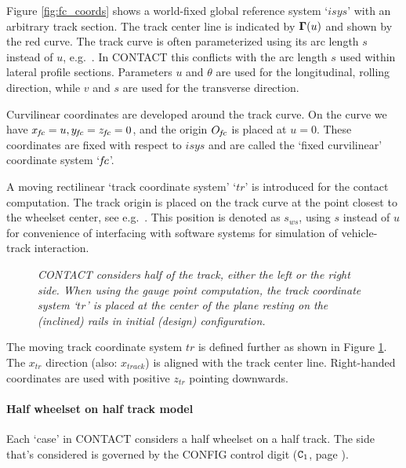 \documentclass[12pt]{report}
\begin{document}
Figure \ref{fig:fc_coords} shows a world-fixed global reference system
`$isys$' with an arbitrary track section. The track center line is indicated
by $\boldsymbol{\Gamma}(u)$ and shown by the red curve. The track curve is
often parameterized using its arc length $s$ instead of $u$, e.g.\
\cite{Shabana2008}. In CONTACT this conflicts with the arc length $s$ used
within lateral profile sections. Parameters $u$ and $\theta$ are used for
the longitudinal, rolling direction, while $v$ and $s$ are used for the
transverse direction.

Curvilinear coordinates are developed around the track curve. On the curve
we have $x_{\mkern-2muf\mkern-2muc}=u, y_{\mkern-2muf\mkern-2muc}=z_{\mkern-2muf\mkern-2muc}=0$, and the origin $O_{\mkern-2muf\mkern-2muc}$ is placed
at $u=0$. These coordinates are fixed with respect to $isys$ and are called
the `fixed curvilinear' coordinate system `$\mkern-2muf\mkern-2muc$'.

A moving rectilinear `track coordinate system' `$tr$' is introduced for the
contact computation. The track origin is placed on the track curve at the
point closest to the wheelset center, see e.g.\ \cite{Malvezzi2008}. This
position is denoted as $s_{ws}$, using $s$ instead of $u$ for
convenience of interfacing with software systems for simulation of
vehicle-track interaction.

\begin{figure}[bt]
\centering
{}
\caption{\em CONTACT considers half of the track, either the left or the
        right side. When using the gauge point computation, the track
        coordinate system `$tr$' is placed at the center of the plane resting
        on the (inclined) rails in initial (design) configuration.}
\label{fig:track_coords}
\end{figure}

The moving track coordinate system $tr$ is defined further as shown in
Figure \ref{fig:track_coords}. The $x_{tr}$ direction (also: $x_{track}$) is
aligned with the track center line. Right-handed coordinates are used with
positive $z_{tr}$ pointing downwards.

\paragraph{Half wheelset on half track model}

Each `case' in CONTACT considers a half wheelset on a half track. The side
that's considered is governed by the CONFIG control digit (${\tt C}_1$,
page \pageref{c1-digit}).
\end{document}
